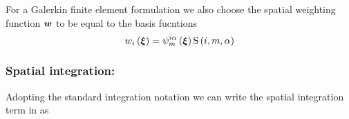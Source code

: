 For a Galerkin finite element formulation we also choose the spatial weighting
function $\vectr{w}$ to be equal to the basis fucntions \ie
\begin{equation}
  \fnof{w_{i}}{\vectr{\xi}}=\idxgbfn{i}{m}{\alpha}{\vectr{\xi}}\idxgsf{i}{m}{\alpha}
\end{equation}

\subsubsection{Spatial integration:}

Adopting the standard integration notation we can write the spatial
integration term in  as


